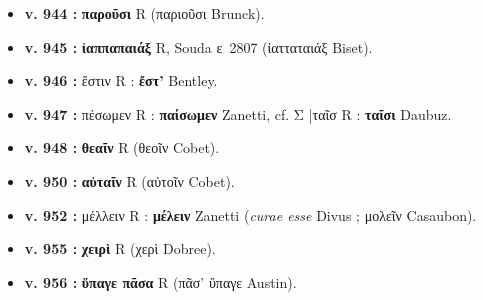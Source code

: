 \documentclass[10pt, a4paper, twoside]{book}
\renewcommand{\_}{\origunderscore\penalty0\relax}
\providecommand{\italique}[1]{\emph{#1}}
\providecommand{\lecon}[1]{\textbf{#1}}
\providecommand{\espApp}{\hspace{0.5em}|\hspace{0.5em}}
\begin{document}
\begin{itemize}
\begin{itemize}
    \item \textbf{v. 944 :} \lecon{παροῦσι} R (παριοῦσι Brunck).
    \item \textbf{v. 945 :} \lecon{ἰαππαπαιάξ} R, Souda ε~2807 (ἰατταταιάξ Biset).
    \item \textbf{v. 946 :} ἔστιν R : \lecon{ἔστ'} Bentley.
    \item \textbf{v. 947 :} πέσωμεν R : \lecon{παίσωμεν} Zanetti, cf. Σ \espApp ταῖσ R : \lecon{ταῖσι} Daubuz.
    \item \textbf{v. 948 :} \lecon{θεαῖν} R (θεοῖν Cobet).
    \item \textbf{v. 950 :} \lecon{αὐταῖν} R (αὐτοῖν Cobet).
    \item \textbf{v. 952 :} μέλλειν R : \lecon{μέλειν} Zanetti (\italique{curae esse} Divus ; μολεῖν Casaubon).
    \item \textbf{v. 955 :} \lecon{χειρὶ} R (χερὶ Dobree).
    \item \textbf{v. 956 :} \lecon{ὕπαγε πᾶσα} R (πᾶσ' ὕπαγε Austin).
  \end{itemize}
\end{itemize}
\end{document}
